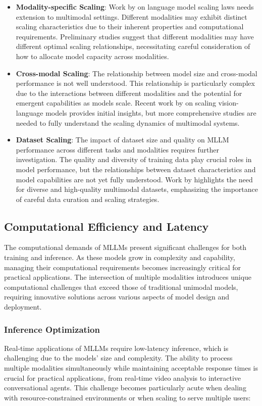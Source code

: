 \begin{itemize}
    \item \textbf{Modality-specific Scaling}: Work by \citet{kaplan2020scaling} on language model scaling laws needs extension to multimodal settings. Different modalities may exhibit distinct scaling characteristics due to their inherent properties and computational requirements. Preliminary studies suggest that different modalities may have different optimal scaling relationships, necessitating careful consideration of how to allocate model capacity across modalities.
    
    \item \textbf{Cross-modal Scaling}: The relationship between model size and cross-modal performance is not well understood. This relationship is particularly complex due to the interactions between different modalities and the potential for emergent capabilities as models scale. Recent work by \citet{zhai2022scaling} on scaling vision-language models provides initial insights, but more comprehensive studies are needed to fully understand the scaling dynamics of multimodal systems.
    
    \item \textbf{Dataset Scaling}: The impact of dataset size and quality on MLLM performance across different tasks and modalities requires further investigation. The quality and diversity of training data play crucial roles in model performance, but the relationships between dataset characteristics and model capabilities are not yet fully understood. Work by \citet{bommasani2021opportunities} highlights the need for diverse and high-quality multimodal datasets, emphasizing the importance of careful data curation and scaling strategies.
\end{itemize}


\subsection{Computational Efficiency and Latency}
The computational demands of MLLMs present significant challenges for both training and inference. As these models grow in complexity and capability, managing their computational requirements becomes increasingly critical for practical applications. The intersection of multiple modalities introduces unique computational challenges that exceed those of traditional unimodal models, requiring innovative solutions across various aspects of model design and deployment.

\subsubsection{Inference Optimization}
Real-time applications of MLLMs require low-latency inference, which is challenging due to the models' size and complexity. The ability to process multiple modalities simultaneously while maintaining acceptable response times is crucial for practical applications, from real-time video analysis to interactive conversational agents. This challenge becomes particularly acute when dealing with resource-constrained environments or when scaling to serve multiple users:

